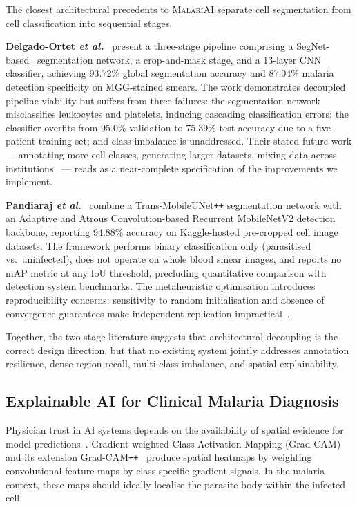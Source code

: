 \documentclass[review,12pt]{elsarticle}
\newcommand{\etal}{\textit{et al.}}
\newcommand{\malariai}{\textsc{MalariAI}}
\begin{document}
The closest architectural precedents to \malariai{} separate cell
segmentation from cell classification into sequential stages.

\textbf{Delgado-Ortet \etal}~\cite{delgado2020} present a three-stage
pipeline comprising a SegNet-based~\cite{badrinarayanan2017} segmentation
network, a crop-and-mask stage, and a 13-layer CNN classifier, achieving
93.72\% global segmentation accuracy and 87.04\% malaria detection
specificity on MGG-stained smears. The work demonstrates decoupled pipeline
viability but suffers from three failures: the segmentation network
misclassifies leukocytes and platelets, inducing cascading classification
errors; the classifier overfits from 95.0\% validation to 75.39\% test
accuracy due to a five-patient training set; and class imbalance is
unaddressed. Their stated future work --- annotating more cell classes,
generating larger datasets, mixing data across institutions~\cite{delgado2020}
--- reads as a near-complete specification of the improvements we implement.

\textbf{Pandiaraj \etal}~\cite{pandiaraj2024} combine a
Trans-MobileUNet\texttt{++} segmentation network with an Adaptive and
Atrous Convolution-based Recurrent MobileNetV2 detection backbone, reporting
94.88\% accuracy on Kaggle-hosted pre-cropped cell image datasets. The
framework performs binary classification only (parasitised vs.\ uninfected),
does not operate on whole blood smear images, and reports no mAP metric at
any IoU threshold, precluding quantitative comparison with detection system
benchmarks. The metaheuristic optimisation introduces reproducibility
concerns: sensitivity to random initialisation and absence of convergence
guarantees make independent replication impractical~\cite{pandiaraj2024}.

Together, the two-stage literature suggests that architectural decoupling
is the correct design direction, but that no existing system jointly
addresses annotation resilience, dense-region recall, multi-class imbalance,
and spatial explainability.

\subsection{Explainable AI for Clinical Malaria Diagnosis}
\label{ssec:xai}

Physician trust in AI systems depends on the availability of spatial
evidence for model predictions~\cite{xai_ensemble2025}. Gradient-weighted
Class Activation Mapping (Grad-CAM)~\cite{selvaraju2017} and its
extension Grad-CAM\texttt{++}~\cite{chattopadhyay2018} produce spatial
heatmaps by weighting convolutional feature maps by class-specific gradient
signals. In the malaria context, these maps should ideally localise the
parasite body within the infected cell.
\end{document}
